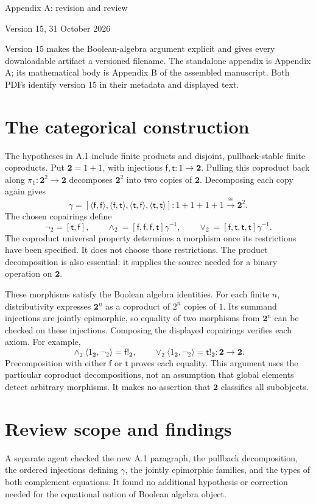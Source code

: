 \documentclass[10pt]{article}
\newcommand{\Two}{\mathbf2}
\begin{document}
{\LARGE Appendix A: revision and review}\par
{\large Version 15, 31 October 2026}\par

Version 15 makes the Boolean-algebra argument explicit and gives every
downloadable artifact a versioned filename. The standalone appendix is
Appendix A; its mathematical body is Appendix B of the assembled manuscript.
Both PDFs identify version 15 in their metadata and displayed text.

\section*{The categorical construction}
The hypotheses in A.1 include finite products and disjoint, pullback-stable
finite coproducts. Put $\Two=1+1$, with injections
$\mathsf f,\mathsf t:1\to\Two$. Pulling this coproduct back along
$\pi_1:\Two^2\to\Two$ decomposes $\Two^2$ into two copies of
$\Two$. Decomposing each copy again gives
\[
\gamma=[\langle\mathsf f,\mathsf f\rangle,
\langle\mathsf f,\mathsf t\rangle,
\langle\mathsf t,\mathsf f\rangle,
\langle\mathsf t,\mathsf t\rangle]:
1+1+1+1\xrightarrow{\cong}\Two^2.
\]
The chosen copairings define
\[
\neg_2=[\mathsf t,\mathsf f],\qquad
\wedge_2=[\mathsf f,\mathsf f,\mathsf f,\mathsf t]\gamma^{-1},
\qquad
\vee_2=[\mathsf f,\mathsf t,\mathsf t,\mathsf t]\gamma^{-1}.
\]
The coproduct universal property determines a morphism once its restrictions
have been specified. It does not choose those restrictions. The product
decomposition is also essential: it supplies the source needed for a binary
operation on $\Two$.

These morphisms satisfy the Boolean algebra identities. For each finite $n$,
distributivity expresses $\Two^n$ as a coproduct of $2^n$ copies of $1$.
Its summand injections are jointly epimorphic, so equality of two morphisms
from $\Two^n$ can be checked on these injections. Composing the displayed
copairings verifies each axiom. For example,
\[
\wedge_2\langle1_{\Two},\neg_2\rangle=\mathsf f!_{\Two},
\qquad
\vee_2\langle1_{\Two},\neg_2\rangle=\mathsf t!_{\Two}:
\Two\to\Two.
\]
Precomposition with either $\mathsf f$ or $\mathsf t$ proves each equality.
This argument uses the particular coproduct decompositions, not an assumption
that global elements detect arbitrary morphisms. It makes no assertion that
$\Two$ classifies all subobjects.

\section*{Review scope and findings}
A separate agent checked the new A.1 paragraph, the pullback decomposition,
the ordered injections defining $\gamma$, the jointly epimorphic families,
and the types of both complement equations. It found no additional hypothesis
or correction needed for the equational notion of Boolean algebra object.
\end{document}
